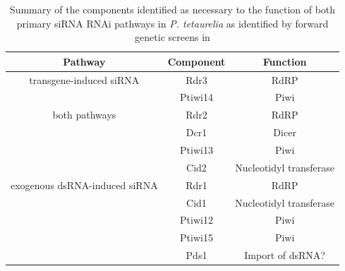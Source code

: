 \begin{table}
    \centering
    \begin{tabular}{|c|c|c|}
        \hline
        \textbf{Pathway} & \textbf{Component} & \textbf{Function} \\
        \hline
        transgene-induced siRNA & Rdr3 & RdRP \\
                                & Ptiwi14 & Piwi \\
        both pathways           & Rdr2 & RdRP \\
                                & Dcr1 & Dicer \\
                                & Ptiwi13 & Piwi \\
                                & Cid2 & Nucleotidyl transferase \\
        exogenous dsRNA-induced siRNA & Rdr1 & RdRP \\
                                      & Cid1 & Nucleotidyl transferase \\
                                      & Ptiwi12 & Piwi \\
                                      & Ptiwi15 & Piwi \\
                                      & Pds1 & Import of dsRNA? \\
        \hline
    \end{tabular}
    \caption[Summary of RNAi pathway components in \textit{P. tetaurelia}]{Summary
        of the components identified as necessary to the function of both
        primary siRNA RNAi pathways in \textit{P. tetaurelia} as identified
        by forward genetic screens in \citep{Marker2014}}
    \label{tab:marker_components}
\end{table}


